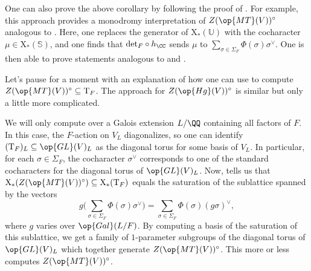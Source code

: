 \documentclass[../thesis.tex]{subfiles}
\begin{document}
\begin{remark} \label{rem:z-mt-as-det-monodromy}
	One can also prove the above corollary by following the proof of . For example, this approach provides a monodromy interpretation of $Z(\op{MT}(V))^\circ$ analogous to . Here, one replaces the generator of $\mathrm X_*(\mathbb U)$ with the cocharacter $\mu\in\mathrm X_*(\mathbb S)$, and one finds that ${\det_F}\circ h_\CC$ sends $\mu$ to $\sum_{\sigma\in\Sigma_F}\Phi(\sigma)\sigma^\lor$. One is then able to prove statements analogous to  and .
\end{remark}
Let's pause for a moment with an explanation of how one can use  to compute $Z(\op{MT}(V))^\circ\subseteq\mathrm T_F$. The approach for $Z(\op{Hg}(V))^\circ$ is similar but only a little more complicated.

We will only compute over a Galois extension $L/\QQ$ containing all factors of $F$. In this case, the $F$-action on $V_L$ diagonalizes, so one can identify $(\mathrm T_F)_L\subseteq\op{GL}(V)_L$ as the diagonal torus for some basis of $V_L$. In particular, for each $\sigma\in\Sigma_F$, the cocharacter $\sigma^\lor$ corresponds to one of the standard cocharacters for the diagonal torus of $\op{GL}(V)_L$. Now,  tells us that $\mathrm X_*(Z(\op{MT}(V))^\circ)\subseteq\mathrm X_*(\mathrm T_F)$ equals the saturation of the sublattice spanned by the vectors
\[g\Bigg(\sum_{\sigma\in\Sigma_F}\Phi(\sigma)\sigma^\lor\Bigg)=\sum_{\sigma\in\Sigma_F}\Phi(\sigma)(g\sigma)^\lor,\]
where $g$ varies over $\op{Gal}(L/F)$. By computing a basis of the saturation of this sublattice, we get a family of $1$-parameter subgroups of the diagonal torus of $\op{GL}(V)_L$ which together generate $Z(\op{MT}(V))^\circ$. This more or less computes $Z(\op{MT}(V))^\circ$.
\end{document}
